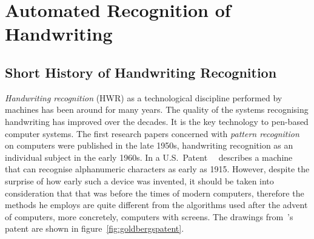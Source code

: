 \section{Automated Recognition of Handwriting}
\label{sec:autorecoofhandwriting}

\subsection{Short History of Handwriting Recognition}
\label{sec:shorthistoryofhwr}

\emph{Handwriting recognition} (HWR) as a technological discipline performed 
by machines has been around for many years. The quality of the systems 
recognising handwriting has improved over the decades. It is the key 
technology to pen-based computer systems. The first research papers 
concerned with \emph{pattern recognition} on computers were published 
in the late 1950s, handwriting recognition as an individual subject in 
the early 1960s. In a U.S.\ Patent~~\citeyear{Goldberg1915} describes 
a machine that can recognise alphanumeric characters as early as 1915. 
However, despite the surprise of how early such a device was invented,
it should be taken into consideration that that was before the times 
of modern computers, therefore the methods he employs are quite different 
from the algorithms used after the advent of computers, more concretely, 
computers with screens. The drawings 
from~'s~\citeyear{Goldberg1915} patent
are shown in figure~\ref{fig:goldbergspatent}.

